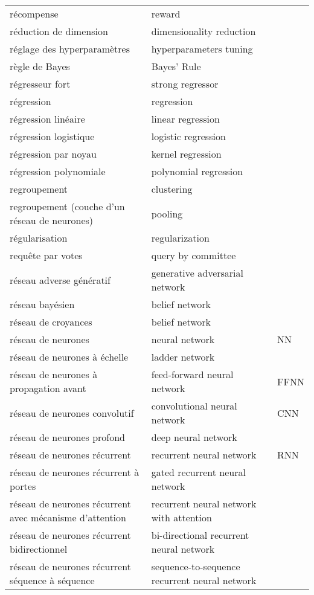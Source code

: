 \begin{longtable}{p{} p{} p{}}
récompense & reward &  \\ 
réduction de dimension & dimensionality reduction &  \\ 
réglage des hyperparamètres & hyperparameters tuning &  \\ 
règle de Bayes & Bayes’ Rule &  \\ 
régresseur fort & strong regressor &  \\ 
régression & regression &  \\ 
régression linéaire & linear regression &  \\ 
régression logistique & logistic regression &  \\ 
régression par noyau & kernel regression &  \\ 
régression polynomiale & polynomial regression &  \\ 
regroupement & clustering &  \\ 
regroupement (couche d'un réseau de neurones) & pooling &  \\ 
régularisation & regularization &  \\ 
requête par votes & query by committee &  \\ 
réseau adverse génératif & generative adversarial network &  \\ 
réseau bayésien & belief network &  \\ 
réseau de croyances & belief network &  \\ 
réseau de neurones & neural network & NN \\ 
réseau de neurones à échelle & ladder network &  \\ 
réseau de neurones à propagation avant & feed-forward neural network & FFNN \\ 
réseau de neurones convolutif & convolutional neural network & CNN \\ 
réseau de neurones profond & deep neural network &  \\ 
réseau de neurones récurrent & recurrent neural network & RNN \\ 
réseau de neurones récurrent à portes & gated recurrent neural network &  \\ 
réseau de neurones récurrent avec mécanisme d’attention & recurrent neural network with attention &  \\ 
réseau de neurones récurrent bidirectionnel & bi-directional recurrent neural network &  \\ 
réseau de neurones récurrent séquence à séquence & sequence-to-sequence recurrent neural network &  \\ 

\end{longtable}

